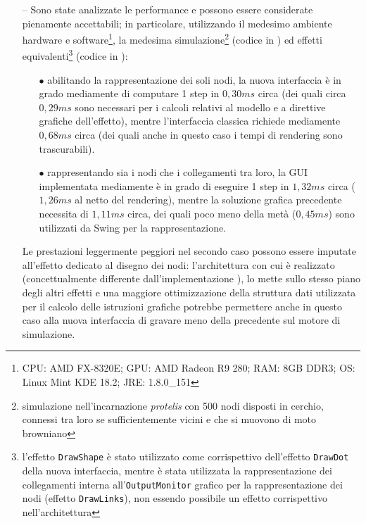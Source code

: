 \begin{itemize}
                  \item[--]
                      Sono state analizzate le performance e possono essere considerate pienamente accettabili; in particolare, utilizzando il medesimo ambiente hardware e software\footnote{CPU: AMD FX-8320E; GPU: AMD Radeon R9 280; RAM: 8GB DDR3; OS: Linux Mint KDE 18.2; JRE: 1.8.0\_151}, la medesima simulazione\footnote{simulazione nell'incarnazione \emph{protelis} con 500 nodi disposti in cerchio, connessi tra loro se sufficientemente vicini e che si muovono di moto browniano} (codice in ) ed effetti equivalenti\footnote{l'effetto \texttt{DrawShape} è stato utilizzato come corrispettivo dell'effetto \texttt{DrawDot} della nuova interfaccia, mentre è stata utilizzata la rappresentazione dei collegamenti interna all'\texttt{OutputMonitor} grafico per la rappresentazione dei nodi (effetto \texttt{DrawLinks}), non essendo possibile un effetto corrispettivo nell'architettura } (codice in ):

                      \begin{itemize}
                        \item[$\bullet$]
                            abilitando la rappresentazione dei soli nodi, la nuova interfaccia è in grado mediamente di computare 1 step in $0,30ms$ circa (dei quali circa $0,29ms$ sono necessari per i calcoli relativi al modello e a direttive grafiche dell'effetto), mentre l'interfaccia classica richiede mediamente $0,68ms$ circa (dei quali anche in questo caso i tempi di rendering sono trascurabili).

                        \item[$\bullet$]
                            rappresentando sia i nodi che i collegamenti tra loro, la GUI implementata mediamente è in grado di eseguire 1 step in $1,32ms$ circa ($1,26ms$ al netto del rendering), mentre la soluzione grafica precedente necessita di $1,11ms$ circa, dei quali poco meno della metà ($0,45ms$) sono utilizzati da Swing per la rappresentazione.
                      \end{itemize}

                      Le prestazioni leggermente peggiori nel secondo caso possono essere imputate all'effetto dedicato al disegno dei nodi: l'architettura con cui è realizzato (concettualmente differente dall'implementazione ), lo mette sullo stesso piano degli altri effetti e una maggiore ottimizzazione della struttura dati utilizzata per il calcolo delle istruzioni grafiche potrebbe permettere anche in questo caso alla nuova interfaccia di gravare meno della precedente sul motore di simulazione.


\end{itemize}
